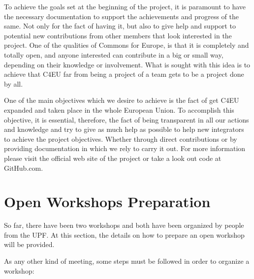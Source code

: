 \documentclass[draftclsnofoot,12pt,journal,onecolumn]{IEEEtran}
\begin{document}
To achieve the goals set at the beginning of the project, it is paramount to have the necessary documentation to support the achievements and progress of the same. Not only for the fact of having it, but also to give help and support to potential new contributions from other members that look interested in the project. One of the qualities of Commons for Europe, is that it is completely and totally open, and anyone interested can contribute in a big or small way, depending on their knowledge or involvement. What is sought with this idea is to achieve that C4EU far from being a project of a team gets to be a project done by all.

One of the main objectives which we desire to achieve is the fact of get C4EU expanded and taken place in the whole European Union. To accomplish this objective, it is essential, therefore, the fact of being transparent in all our actions and knowledge and try to give as much help as possible to help new integrators to achieve the project objectives. Whether through direct contributions or by providing documentation in which we rely to carry it out. For more information please visit the official web site of the project or take a look out code at GitHub.com.


\section{Open Workshops Preparation}
\label{sec:workshops}

So far, there have been two workshops and both have been organized by people from the UPF. At this section, the details on how to prepare an open workshop will be provided.


As any other kind of meeting, some steps must be followed in order to organize a workshop:
\end{document}
